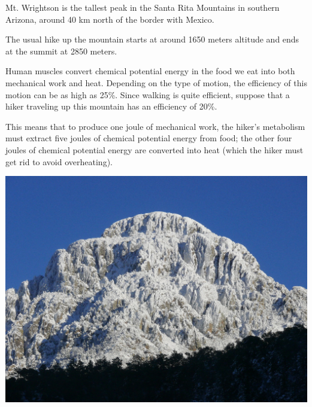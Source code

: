 \documentclass[12pt]{article}
\begin{document}
\newpage


\begin{minipage}{0.4\textwidth}
	
Mt. Wrightson is the tallest peak in the Santa Rita Mountains in southern Arizona, around 40 km north of the border with Mexico.

\bigskip
	
The usual hike up the mountain starts at around 1650 meters altitude and ends at the summit at 2850 meters.
\bigskip



Human muscles convert chemical potential energy in the food we eat into both mechanical work and heat. Depending on the type of motion, the efficiency of this motion can be as high as 25\%. Since walking is quite efficient, suppose that a hiker traveling up this mountain has an efficiency of 20\%. 

\bigskip

This means that to produce one joule of mechanical work, the hiker's metabolism must extract five joules of chemical potential energy from food; the other four joules of chemical potential energy are converted into heat (which the hiker must get rid to avoid overheating).




\end{minipage}
\hspace{0.05\textwidth}
\begin{minipage}{0.5\textwidth}
\includegraphics[width=\textwidth]{wrightson1024.jpg}
\end{minipage}
\end{document}
